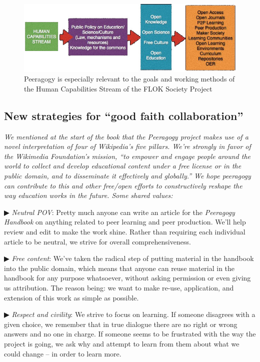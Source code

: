 \begin{figure}
\includegraphics[width=\textwidth]{../pictures/flok2.jpg}
\caption*{Peeragogy is especially relevant to the goals and working methods of the Human Capabilities Stream of the FLOK Society Project}
\end{figure}

\clearpage

\begin{mdframed}
\label{good-faith-collaboration}
\subsection{New strategies for ``good faith collaboration''}

\noindent \emph{We mentioned at the start of the book that the
  Peeragogy project makes use of a novel interpretation of four of
  Wikipedia's five pillars.  We're strongly in favor of the Wikimedia
  Foundation's mission, ``to empower and engage people around the
  world to collect and develop educational content under a free
  license or in the public domain, and to disseminate it effectively
  and globally.''  We hope peeragogy can contribute to this and
  other free/open efforts to constructively reshape the way education
  works in the future.  Some shared values:}

▶ \emph{Neutral POV}: Pretty much anyone can write an article for the
\emph{Peeragogy Handbook} on anything related to peer learning and
peer production.  We'll help review and edit to make the work shine.
Rather than requiring each individual article to be neutral, we strive
for overall comprehensiveness.

▶ \emph{Free content}: We've taken the radical step of putting
material in the handbook into the public domain, which means that
anyone can reuse material in the handbook for any purpose whatsoever,
without asking permission or even giving us attribution.  The reason
being: we want to make re-use, application, and extension of this work
as simple as possible.

▶ \emph{Respect and civility}: We strive to focus on learning.  If
someone disagrees with a given choice, we remember that in true
dialogue there are no right or wrong answers and no one in charge.  If
someone seems to be frustrated with the way the project is going, we
ask why and attempt to learn from them about what we could change --
in order to learn more.


\end{mdframed}
